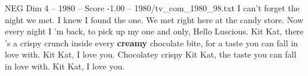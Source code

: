 \begin{textsample}{NEG Dim 4 – 1980 – Score -1.00 – 1980/tv\_com\_1980\_98.txt}  \label{ex:f4_neg_035}
I can't forget the night we met.
I knew I found the one.
We met right here at the candy store.
Now every night I 'm back, to pick up my one and only, Hello Luscious.
Kit Kat, there 's a crispy crunch inside every \textbf{creamy} chocolate bite, for a taste you can fall in love with.
Kit Kat, I love you.
Chocolatey crispy Kit Kat, the taste you can fall in love with.
Kit Kat, I love you.

\end{textsample}
